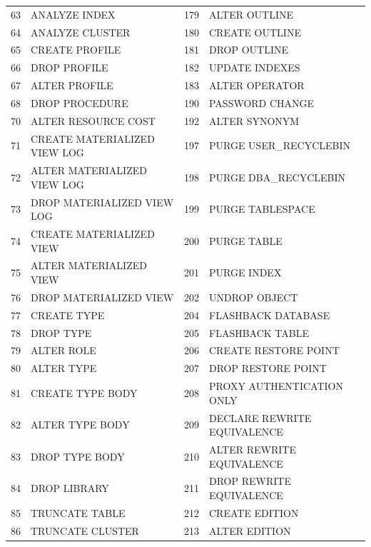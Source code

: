 \begin{appendix}
\begin{longtable}[]{@{}rl|rl@{}}
63   & ANALYZE INDEX                & 179 & ALTER OUTLINE                \\
64   & ANALYZE CLUSTER              & 180 & CREATE OUTLINE               \\
65   & CREATE PROFILE               & 181 & DROP OUTLINE                 \\
66   & DROP PROFILE                 & 182 & UPDATE INDEXES               \\
67   & ALTER PROFILE                & 183 & ALTER OPERATOR               \\
68   & DROP PROCEDURE               & 190 & PASSWORD CHANGE              \\
70   & ALTER RESOURCE COST          & 192 & ALTER SYNONYM                \\
71   & CREATE MATERIALIZED VIEW LOG & 197 & PURGE USER\_RECYCLEBIN       \\
72   & ALTER MATERIALIZED VIEW LOG  & 198 & PURGE DBA\_RECYCLEBIN        \\
73   & DROP MATERIALIZED VIEW LOG   & 199 & PURGE TABLESPACE             \\
74   & CREATE MATERIALIZED VIEW     & 200 & PURGE TABLE                  \\
75   & ALTER MATERIALIZED VIEW      & 201 & PURGE INDEX                  \\
76   & DROP MATERIALIZED VIEW       & 202 & UNDROP OBJECT                \\
77   & CREATE TYPE                  & 204 & FLASHBACK DATABASE           \\
78   & DROP TYPE                    & 205 & FLASHBACK TABLE              \\
79   & ALTER ROLE                   & 206 & CREATE RESTORE POINT         \\
80   & ALTER TYPE                   & 207 & DROP RESTORE POINT           \\
81   & CREATE TYPE BODY             & 208 & PROXY AUTHENTICATION ONLY    \\
82   & ALTER TYPE BODY              & 209 & DECLARE REWRITE EQUIVALENCE  \\
83   & DROP TYPE BODY               & 210 & ALTER REWRITE EQUIVALENCE    \\
84   & DROP LIBRARY                 & 211 & DROP REWRITE EQUIVALENCE     \\
85   & TRUNCATE TABLE               & 212 & CREATE EDITION               \\
86   & TRUNCATE CLUSTER             & 213 & ALTER EDITION                \\

\end{longtable}
\end{appendix}
